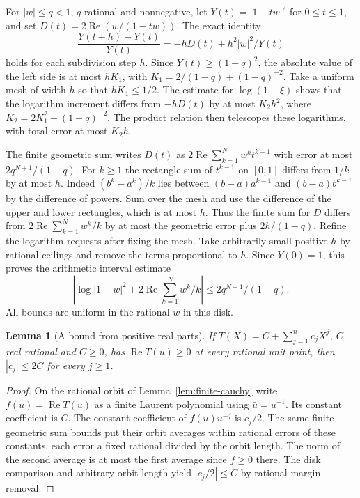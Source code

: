 \documentclass[11pt]{amsart}
\newtheorem{lemma}[theorem]{Lemma}
\theoremstyle{definition}
\theoremstyle{remark}
\numberwithin{equation}{section}
\newcommand{\re}{\operatorname{Re}}
\begin{document}
For $|w|\le q<1$, $q$ rational and nonnegative, let
$Y(t)=|1-tw|^2$ for $0\le t\le1$, and set
$D(t)=2\re(w/(1-tw))$. The exact identity
\[
 \frac{Y(t+h)-Y(t)}{Y(t)}
     =-hD(t)+h^2 |w|^2/Y(t)
\]
holds for each subdivision step $h$. Since
$Y(t)\ge(1-q)^2$, the absolute value of the left side
is at most $h K_1$, with $K_1=2/(1-q)+(1-q)^{-2}$.
Take a uniform mesh of width $h$ so that $hK_1\le1/2$.
The estimate for $\log(1+\xi)$ shows that the logarithm
increment differs from $-hD(t)$ by at most
$K_2h^2$, where $K_2=2K_1^2+(1-q)^{-2}$.
The product relation then telescopes these logarithms,
with total error at most $K_2h$.

The finite geometric sum writes $D(t)$ as
$2\re\sum_{k=1}^N w^k t^{k-1}$ with error at most
$2q^{N+1}/(1-q)$. For $k\ge1$ the rectangle sum of
$t^{k-1}$ on $[0,1]$ differs from $1/k$ by at most $h$.
Indeed $(b^k-a^k)/k$ lies between $(b-a)a^{k-1}$
and $(b-a)b^{k-1}$ by the difference of powers. Sum
over the mesh and use the difference of the upper and lower
rectangles, which is at most $h$. Thus the finite sum for
$D$ differs from $2\re\sum_{k=1}^N w^k/k$ by at most the
geometric error plus $2h/(1-q)$. Refine the logarithm
requests after fixing the mesh. Take arbitrarily small
positive $h$ by rational ceilings and remove the terms
proportional to $h$. Since $Y(0)=1$, this proves the
arithmetic interval estimate
\begin{equation}\label{eq:finite-factor-log}
  \left|\log |1-w|^2+2\re\sum_{k=1}^N w^k/k\right|
          \le 2q^{N+1}/(1-q).
\end{equation}
All bounds are uniform in the rational $w$ in this disk.

\begin{lemma}[A bound from positive real parts]
\label{lem:real-part-coefficients}
If $T(X)=C+\sum_{j=1}^n c_jX^j$, $C$ real rational and
$C\ge0$, has $\re T(u)\ge0$ at every rational unit point,
then $|c_j|\le2C$ for every $j\ge1$.
\end{lemma}
\begin{proof}
On the rational orbit of Lemma~\ref{lem:finite-cauchy} write
$f(u)=\re T(u)$ as a finite Laurent polynomial using
$\bar u=u^{-1}$. Its constant coefficient is $C$.
The constant coefficient of $f(u)u^{-j}$ is $c_j/2$.
The same finite geometric sum bounds put their orbit averages
within rational errors of these constants, each error a fixed
rational divided by the orbit length. The norm of the second
average is at most the first average since $f\ge0$ there.
The disk comparison and arbitrary orbit length yield
$|c_j/2|\le C$ by rational margin removal.
\end{proof}
\end{document}
